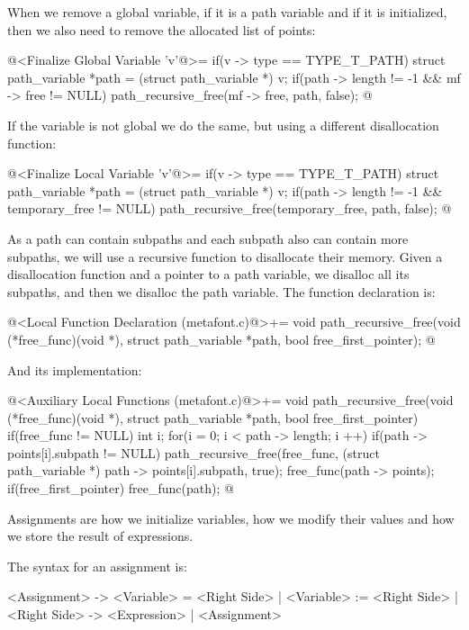 When we remove a global variable, if it is a path variable and if it
is initialized, then we also need to remove the allocated list of
points:

\iniciocodigo
@<Finalize Global Variable 'v'@>=
if(v -> type == TYPE_T_PATH){
  struct path_variable *path = (struct path_variable *) v;
  if(path -> length != -1 && mf -> free != NULL)
    path_recursive_free(mf -> free, path, false);
}
@
\fimcodigo

If the variable is not global we do the same, but using a different
disallocation function:

\iniciocodigo
@<Finalize Local Variable 'v'@>=
if(v -> type == TYPE_T_PATH){
  struct path_variable *path = (struct path_variable *) v;
  if(path -> length != -1 && temporary_free != NULL)
    path_recursive_free(temporary_free, path, false);
}
@
\fimcodigo

As a path can contain subpaths and each subpath also can contain more
subpaths, we will use a recursive function to disallocate their
memory. Given a disallocation function and a pointer to a path
variable, we disalloc all its subpaths, and then we disalloc the path
variable. The function declaration is:

\iniciocodigo
@<Local Function Declaration (metafont.c)@>+=
void path_recursive_free(void (*free_func)(void *),
                         struct path_variable *path,
                         bool free_first_pointer);
@
\fimcodigo

And its implementation:

\iniciocodigo
@<Auxiliary Local Functions (metafont.c)@>+=
void path_recursive_free(void (*free_func)(void *),
                         struct path_variable *path,
                         bool free_first_pointer){
  if(free_func != NULL){
    int i;
    for(i = 0; i < path -> length; i ++){
      if(path -> points[i].subpath != NULL)
        path_recursive_free(free_func, (struct path_variable *)
                                       path -> points[i].subpath, true);
    }
    free_func(path -> points);
    if(free_first_pointer)
      free_func(path);
  }
}
@
\fimcodigo


Assignments are how we initialize variables, how we modify their
values and how we store the result of expressions.

The syntax for an assignment is:

\alinhaverbatim
<Assignment> -> <Variable> = <Right Side> |
                <Variable> := <Right Side> |
<Right Side> -> <Expression> | <Assignment>
\alinhanormal

